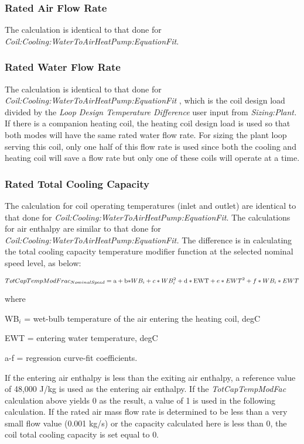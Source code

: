 \subsubsection{Rated Air Flow Rate}\label{rated-air-flow-rate-1}

The calculation is identical to that done for \emph{Coil:Cooling:WaterToAirHeatPump:EquationFit}.

\subsubsection{Rated Water Flow Rate}\label{rated-water-flow-rate-1}

The calculation is identical to that done for \emph{Coil:Cooling:WaterToAirHeatPump:EquationFit} , which is the coil design load divided by the \emph{Loop Design Temperature Difference} user input from \emph{Sizing:Plant.} If there is a companion heating coil, the heating coil design load is used so that both modes will have the same rated water flow rate. For sizing the plant loop serving this coil, only one half of this flow rate is used since both the cooling and heating coil will save a flow rate but only one of these coils will operate at a time.

\subsubsection{Rated Total Cooling Capacity}\label{rated-total-cooling-capacity-1}

The calculation for coil operating temperatures (inlet and outlet) are identical to that done for \emph{Coil:Cooling:WaterToAirHeatPump:EquationFit}. The calculations for air enthalpy are similar to that done for \emph{Coil:Cooling:WaterToAirHeatPump:EquationFit.} The difference is in calculating the total cooling capacity temperature modifier function at the selected nominal speed level, as below:

\begin{equation}
TotCapTempModFra{c_{NominalSpeed}} = {\rm{a}} + {\rm{b*}}W{B_i} + c*WB_i^2 + {\rm{d*EWT}} + e*EW{T^2} + f*W{B_i}*EWT
\end{equation}

where

WB\(_{i}\) = wet-bulb temperature of the air entering the heating coil, degC

EWT = entering water temperature, degC

a-f = regression curve-fit coefficients.

If the entering air enthalpy is less than the exiting air enthalpy, a reference value of 48,000 J/kg is used as the entering air enthalpy. If the \emph{TotCapTempModFac} calculation above yields 0 as the result, a value of 1 is used in the following calculation. If the rated air mass flow rate is determined to be less than a very small flow value (0.001 kg/s) or the capacity calculated here is less than 0, the coil total cooling capacity is set equal to 0.

